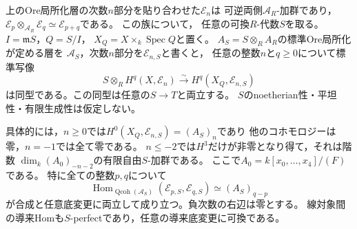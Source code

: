 \begin{proposition}[全次数コホモロジーと任意底変更]
\label{prop:artin-ore-universal-cohomology}
\label{prop:artin-ore-section}
上のOre局所化層の次数$n$部分を貼り合わせた$\mathscr E_n$は
可逆両側$\mathscr A_R$-加群であり，
$\mathscr E_p\otimes_{\mathscr A_R}\mathscr E_q\simeq\mathscr E_{p+q}$である。
この族について，
任意の可換$R$-代数$S$を取る。$I=\mathfrak mS$，$Q=S/I$，
$X_Q=X\times_k\operatorname{Spec}Q$と置く。
$A_S=S\otimes_RA_R$の標準Ore局所化が定める層を
$\mathscr A_S$，次数$n$部分を$\mathscr E_{n,S}$と書くと，
任意の整数$n$と$q\ge0$について標準写像
\[
 S\otimes_R H^q(X,\mathscr E_n)
   \xrightarrow{\sim}H^q(X_Q,\mathscr E_{n,S})
\]
は同型である。この同型は任意の$S\to T$と両立する。
$S$のnoetherian性・平坦性・有限生成性は仮定しない。

具体的には，$n\ge0$では$H^0(X_Q,\mathscr E_{n,S})=(A_S)_n$であり
他のコホモロジーは零，$n=-1$では全て零である。
$n\le-2$では$H^3$だけが非零となり得て，それは階数
$\dim_k(A_0)_{-n-2}$の有限自由$S$-加群である。
ここで$A_0=k[x_0,\ldots,x_4]/(F)$である。
特に全ての整数$p,q$について
\[
 \operatorname{Hom}_{\operatorname{Qcoh}(\mathscr A_S)}
   (\mathscr E_{p,S},\mathscr E_{q,S})
  \simeq(A_S)_{q-p}
\]
が合成と任意底変更に両立して成り立つ。負次数の右辺は零とする。
線対象間の導来Homも$S$-perfectであり，任意の導来底変更に可換である。
\end{proposition}
